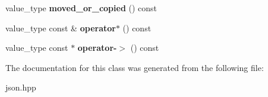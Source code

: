 \begin{DoxyCompactItemize}
value\+\_\+type {\bfseries moved\+\_\+or\+\_\+copied} () const
\item 
\mbox{\label{classnlohmann_1_1detail_1_1json__ref_aa3100e41472dba02ab78ccc1607e44ab}} 
value\+\_\+type const  \& {\bfseries operator$\ast$} () const
\item 
\mbox{\label{classnlohmann_1_1detail_1_1json__ref_adb652774a67829876449dc0b30637456}} 
value\+\_\+type const  $\ast$ {\bfseries operator-\/$>$} () const
\end{DoxyCompactItemize}


The documentation for this class was generated from the following file\+:\begin{DoxyCompactItemize}
\item 
json.\+hpp\end{DoxyCompactItemize}
